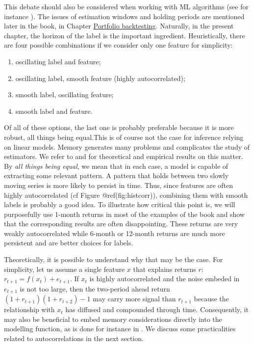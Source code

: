 This debate should also be considered when working with ML algorithms (see for instance \cite{geertsema2020cross}). The issues of estimation windows and holding periods are mentioned later in the book, in Chapter \href{/chap-15-portfolio-backtesting}{Portfolio backtesting}. Naturally, in the present chapter, the horizon of the label is the important ingredient. Heuristically, there are four possible combinations if we consider only one feature for simplicity:

\begin{enumerate}
\item oscillating label and feature;
\item oscillating label, smooth feature (highly autocorrelated);
\item smooth label, oscillating feature;
\item smooth label and feature.
\end{enumerate}

Of all of these options, the last one is probably preferable because it is more robust, all things being equal.This is of course not the case for inference relying on linear models. Memory generates many problems and complicates the study of estimators. We refer to \cite{hjalmarsson2011new} and \cite{xu2020testing} for theoretical and empirical results on this matter. By \textit{all things being equal}, we mean that in each case, a model is capable of extracting some relevant pattern. A pattern that holds between two slowly moving series is more likely to persist in time. Thus, since features are often highly autocorrelated (cf Figure @ref(fig:histcorr)), combining them with smooth labels is probably a good idea. To illustrate how critical this point is, we will purposefully use 1-month returns in most of the examples of the book and show that the corresponding results are often disappointing. These returns are very weakly autocorrelated while 6-month or 12-month returns are much more persistent and are better choices for labels.

Theoretically, it is possible to understand why that may be the case. For simplicity, let us assume a single feature $x$ that explains returns $r$: $r_{t+1}=f(x_t)+e_{t+1}$. If $x_t$ is highly autocorrelated and the noise embeded in $e_{t+1}$ is not too large, then the two-period ahead return $(1+r_{t+1})(1+r_{t+2}) -1$ may carry more signal than $r_{t+1}$ because the relationship with $x_t$ has diffused and compounded through time. Consequently, it may also be beneficial to embed memory considerations directly into the modelling function, as is done for instance in \cite{dixon2020industrial}. We discuss some practicalities related to autocorrelations in the next section.

